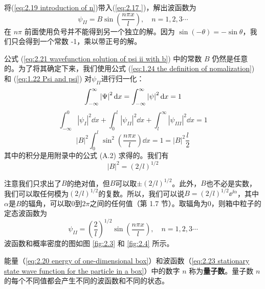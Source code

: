 	将(\ref{eq:2.19 introduction of n})带入(\ref{eq:2.17 })，解出波函数为
	\begin{equation}
		\psi_{II} = B\sin\left(\frac{n\pi x}{l}\right), \quad n = 1,2,3\cdots
		\label{eq:2.21 wavefunction solution of psi ii with b}
	\end{equation}
	在 $n\pi$ 前面使用负号并不能得到另一个独立的解。因为 $\sin\left(-\theta\right)=-\sin\theta$，我们只会得到一个常数 -1，乘以带正号的解。

	公式 (\ref{eq:2.21 wavefunction solution of psi ii with b}) 中的常数 $B$ 仍然是任意的。为了将其确定下来，我们使用公式 (\ref{eq:1.24 the definition of nomalization}) 和 (\ref{eq:1.22 Psi and psi}) 对$\psi_{II}$进行归一化：
	\begin{equation*}
		\int_{-\infty}^{\infty}\left|\Psi\right|^2\dd x = \int_{-\infty}^{\infty}\left|\psi\right|^2\dd x = 1
	\end{equation*}
	\begin{equation*}
		\int_{-\infty}^{0}\left|\psi_I\right|^2\dd x + \int_{0}^{l}\left|\psi_{II}\right|^2\dd x +\int_{l}^{\infty}\left|\psi_{III}\right|^2\dd x =1
	\end{equation*}
	\begin{equation}
		\left|B\right|^2\int_{0}^{l}\sin^2\left(\frac{n\pi x}{l}\right)\dd x=1=\left|B\right|^2\frac{l}{2}
		\label{eq:2.22 process of fix constant B}
	\end{equation}
	其中的积分是用附录中的公式 (A.2) 求得的。我们有
	\begin{equation*}
		\left|B\right|^2=\left(2/l\right)^{1/2}
	\end{equation*}

	注意我们只求出了$B$的绝对值，但$B$可以取$\pm \left( 2/l\right) ^{1/2}$。此外，$B$也不必是实数，我们可以取任何模为$\left(2/l\right)^{1/2}$的复数。所以，我们可以说$B=\left( 2/l\right) ^{1/2}\ee^{\ii \alpha}$，其中$\alpha$是$B$的辐角，可以取0到$2\pi$之间的任何值（第 1.7 节）。取辐角为0，则箱中粒子的定态波函数为
	\begin{equation}
		\boxed{
			\psi_{II} = \left(\frac{2}{l}\right)^{1/2}\sin\left(\frac{n\pi x}{l}\right), \quad n = 1,2,3\cdots
		}
		\label{eq:2.23 stationary state wave function for the particle in a box}
	\end{equation}
	波函数和概率密度的图如图 \ref{fig:2.3} 和 \ref{fig:2.4} 所示。

	能量（\ref{eq:2.20 energy of one-dimensional box}）和波函数（\ref{eq:2.23 stationary state wave function for the particle in a box}）中的数字 $n$ 称为\textbf{量子数}。量子数 $n$ 的每个不同值都会产生不同的波函数和不同的状态。

